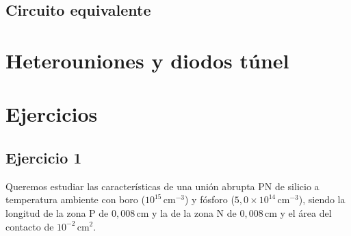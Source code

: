 \subsection{Circuito equivalente}






\section{Heterouniones y diodos túnel}






\newpage

\section{Ejercicios}


\subsection{Ejercicio 1}

Queremos estudiar las características de una unión abrupta PN de silicio a temperatura ambiente con boro (\(10^{15} \, \text{cm}^{-3}\)) y fósforo (\(5,0 \times 10^{14} \, \text{cm}^{-3}\)), siendo la longitud de la zona P de \(0,008 \, \text{cm}\) y la de la zona N de \(0,008 \, \text{cm}\) y el área del contacto de \(10^{-2} \, \text{cm}^2\). 


